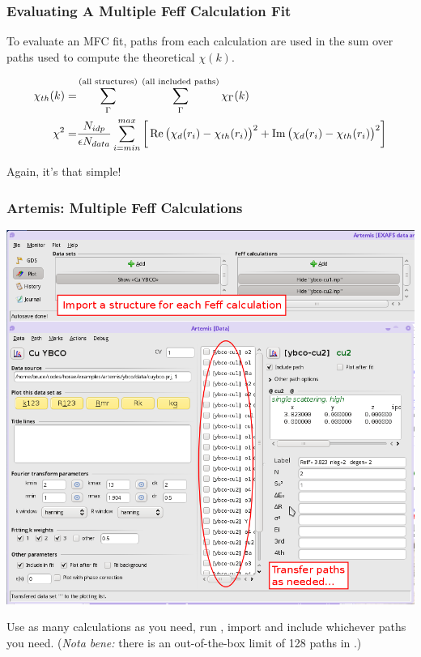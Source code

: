 \documentclass[10pt, xcolor=x11names, compress]{beamer}
\begin{document}
\begin{frame}
  \frametitle{Evaluating A Multiple Feff Calculation Fit}

  To evaluate an MFC fit, paths from each {\feff} calculation are used
  in the sum over paths used to compute the theoretical $\chi(k)$.
  
  {\small
    \begin{align}
      \chi_{th}(k) =& \sum\limits_\Gamma^{\textrm{(all structures)}} \>
      \sum\limits_\Gamma^{\textrm{(all included paths)}}\chi_\Gamma(k)
      \notag \\
      \chi^2      =& \frac{N_{idp}}{\epsilon N_{data}}
                     \sum\limits_{i=min}^{max} 
                       \bigg[\Re\big(\chi_d(r_i)-\chi_{th}(r_i)\big)^2 + 
                             \Im\big(\chi_d(r_i)-\chi_{th}(r_i)\big)^2\bigg]
                     \notag
    \end{align}}

  \begin{exampleblock}{}
    \begin{center}
      Again, it's that simple!
    \end{center}
  \end{exampleblock}
\end{frame}

\begin{frame}
  \frametitle{Artemis: Multiple Feff Calculations}

  \begin{center}
    \includegraphics[width=0.6\linewidth]{artemis/mfc.png}

    Use as many {\feff} calculations as you need, run {\feff}, import
    and include whichever paths you need.  (\textit{Nota bene:} there
    is an out-of-the-box limit of 128 paths in {\ifeffit}.)
  \end{center}
\end{frame}
\end{document}
